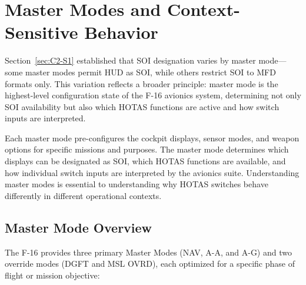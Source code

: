 \documentclass[11pt, a4paper, twoside]{report}
\begin{document}
\section{Master Modes and Context-Sensitive Behavior}
\label{sec:C2-S2}

Section~\ref{sec:C2-S1} established that SOI designation varies by master mode—some master modes permit HUD as SOI, while others restrict SOI to MFD formats only. This variation reflects a broader principle: master mode is the highest-level configuration state of the F-16 avionics system, determining not only SOI availability but also which HOTAS functions are active and how switch inputs are interpreted.

Each master mode pre-configures the cockpit displays, sensor modes, and weapon options for specific missions and purposes. The master mode determines which displays can be designated as SOI, which HOTAS functions are available, and how individual switch inputs are interpreted by the avionics suite. Understanding master modes is essential to understanding why HOTAS switches behave differently in different operational contexts.


\subsection{Master Mode Overview}
\label{sec:C2-S2-S1}

The F-16 provides three primary Master Modes (NAV, A-A, and A-G) and two override modes (DGFT and MSL OVRD), each optimized for a specific phase of flight or mission objective:
\end{document}
